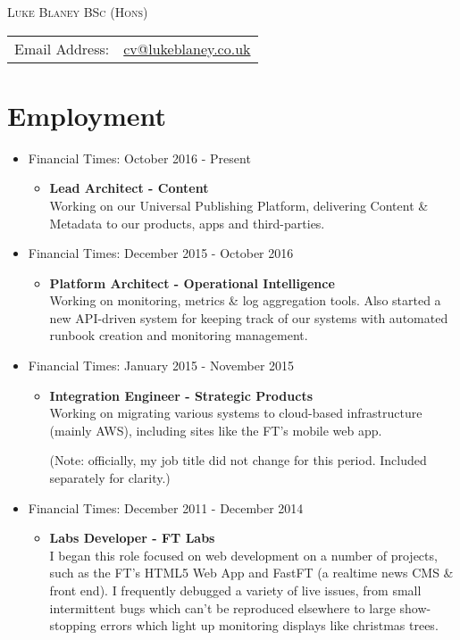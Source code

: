 \documentclass[a4paper]{article}
\begin{document}
\begin{center}\textsc{\LARGE Luke Blaney BSc (Hons)}\end{center}

\begin{tabular}{ l l }

Email Address: & \href{mailto:cv@lukeblaney.co.uk}{cv@lukeblaney.co.uk}\\

\end{tabular}

\section*{Employment}


\begin{itemize}

\item Financial Times: October 2016 - Present
\begin{itemize}\item
 {\bf Lead Architect - Content}\\
Working on our Universal Publishing Platform, delivering Content \& Metadata to our products, apps and third-parties.
\end{itemize}

\item Financial Times: December 2015 - October 2016
\begin{itemize}\item
 {\bf Platform Architect - Operational Intelligence}\\
 Working on monitoring, metrics \& log aggregation tools. Also started a new API-driven system for keeping track of our systems with automated runbook creation and monitoring management.
\end{itemize}

\item Financial Times: January 2015 - November 2015
\begin{itemize}

\item {\bf Integration Engineer - Strategic Products} \\
Working on migrating various systems to cloud-based infrastructure (mainly AWS), including sites like the FT's mobile web app.

(Note: officially, my job title did not change for this period. Included separately for clarity.)
\end{itemize}

\item Financial Times: December 2011 - December 2014
\begin{itemize}
\item {\bf Labs Developer - FT Labs}\\
I began this role focused on web development on a number of projects, such as the FT's HTML5 Web App and FastFT (a realtime news CMS \& front end). I frequently debugged a variety of live issues, from small intermittent bugs which can't be reproduced elsewhere to large show-stopping errors which light up monitoring displays like christmas trees.\par


\end{itemize}
\end{itemize}
\end{document}
